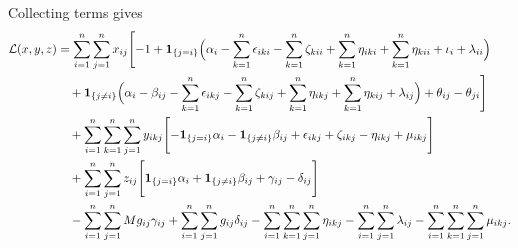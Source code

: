 Collecting terms gives
\[
\begin{aligned}
\mathcal{L}(x,y,z) &= \sum_{i=1}^n \sum_{j=1}^n x_{ij} \Biggl[-1 + \mathbf{1}_{\{j=i\}} \Bigl(\alpha_i - \sum_{k=1}^n \epsilon_{ik i} - \sum_{k=1}^n \zeta_{k i i} + \sum_{k=1}^n \eta_{ik i} + \sum_{k=1}^n \eta_{k i i} + \iota_i + \lambda_{ii}\Bigr)\\
&\quad + \mathbf{1}_{\{j\neq i\}} \Bigl(\alpha_i - \beta_{ij} - \sum_{k=1}^n \epsilon_{ikj} - \sum_{k=1}^n \zeta_{kij} + \sum_{k=1}^n \eta_{ikj} + \sum_{k=1}^n \eta_{kij} + \lambda_{ij}\Bigr) + \theta_{ij} - \theta_{ji}\Biggr]\\
&\quad + \sum_{i=1}^n \sum_{k=1}^n \sum_{j=1}^n y_{ikj} \Biggl[-\mathbf{1}_{\{j=i\}}\alpha_i - \mathbf{1}_{\{j\neq i\}}\beta_{ij} + \epsilon_{ikj} + \zeta_{ikj} - \eta_{ikj} + \mu_{ikj}\Biggr] \\
&\quad + \sum_{i=1}^n \sum_{j=1}^n z_{ij} \Biggl[\mathbf{1}_{\{j=i\}}\alpha_i + \mathbf{1}_{\{j\neq i\}}\beta_{ij} + \gamma_{ij} - \delta_{ij}\Biggr] \\
&\quad - \sum_{i=1}^n \sum_{j=1}^n M g_{ij}\gamma_{ij} + \sum_{i=1}^n \sum_{j=1}^n g_{ij}\delta_{ij} - \sum_{i=1}^n \sum_{k=1}^n \sum_{j=1}^n \eta_{ikj} - \sum_{i=1}^n \sum_{j=1}^n \lambda_{ij} - \sum_{i=1}^n \sum_{k=1}^n \sum_{j=1}^n \mu_{ikj}.
\end{aligned}
\]